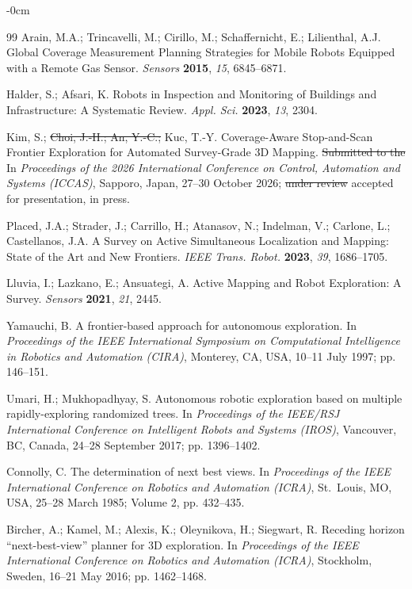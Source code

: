 \documentclass[sensors,article,submit,pdftex,moreauthors]{Definitions/mdpi}
\providecommand{\DIFadd}[1]{{\protect\color{blue} \sf #1}} %
\providecommand{\DIFdel}[1]{{\protect\color{red}\protect\scriptsize\protect\sout{#1}}} %
\providecommand{\DIFaddbegin}{} %
\providecommand{\DIFaddend}{} %
\providecommand{\DIFdelbegin}{} %
\providecommand{\DIFdelend}{} %
\begin{document}
\begin{adjustwidth}{-\extralength}{0cm}
\begin{thebibliography}{99}
Arain, M.A.; Trincavelli, M.; Cirillo, M.; Schaffernicht, E.; Lilienthal, A.J. Global Coverage Measurement Planning Strategies for Mobile Robots Equipped with a Remote Gas Sensor. \textit{Sensors} \textbf{2015}, \textit{15}, 6845--6871.

Halder, S.; Afsari, K. Robots in Inspection and Monitoring of Buildings and Infrastructure: A Systematic Review. \textit{Appl. Sci.} \textbf{2023}, \textit{13}, 2304.

Kim, S.; \DIFdelbegin \DIFdel{Choi, J.-H.; An, Y.-C.; }\DIFdelend Kuc, T.-Y. Coverage-Aware Stop-and-Scan Frontier Exploration for Automated Survey-Grade 3D Mapping. \DIFdelbegin \DIFdel{Submitted to the }\DIFdelend \DIFaddbegin \DIFadd{In }\DIFaddend \textit{\DIFaddbegin \DIFadd{Proceedings of the }\DIFaddend 2026 International Conference on Control, Automation and Systems (ICCAS)}, Sapporo, Japan, 27--30 October 2026; \DIFdelbegin \DIFdel{under review}\DIFdelend \DIFaddbegin \DIFadd{accepted for presentation, in press}\DIFaddend .

Placed, J.A.; Strader, J.; Carrillo, H.; Atanasov, N.; Indelman, V.; Carlone, L.; Castellanos, J.A. A Survey on Active Simultaneous Localization and Mapping: State of the Art and New Frontiers. \textit{IEEE Trans. Robot.} \textbf{2023}, \textit{39}, 1686--1705.

Lluvia, I.; Lazkano, E.; Ansuategi, A. Active Mapping and Robot Exploration: A Survey. \textit{Sensors} \textbf{2021}, \textit{21}, 2445.

Yamauchi, B. A frontier-based approach for autonomous exploration. In \textit{Proceedings of the IEEE International Symposium on Computational Intelligence in Robotics and Automation (CIRA)}, Monterey, CA, USA, 10--11 July 1997; pp. 146--151.

Umari, H.; Mukhopadhyay, S. Autonomous robotic exploration based on multiple rapidly-exploring randomized trees. In \textit{Proceedings of the IEEE/RSJ International Conference on Intelligent Robots and Systems (IROS)}, Vancouver, BC, Canada, 24--28 September 2017; pp. 1396--1402.

Connolly, C. The determination of next best views. In \textit{Proceedings of the IEEE International Conference on Robotics and Automation (ICRA)}, St.\ Louis, MO, USA, 25--28 March 1985; Volume 2, pp. 432--435.

Bircher, A.; Kamel, M.; Alexis, K.; Oleynikova, H.; Siegwart, R. Receding horizon ``next-best-view'' planner for 3D exploration. In \textit{Proceedings of the IEEE International Conference on Robotics and Automation (ICRA)}, Stockholm, Sweden, 16--21 May 2016; pp. 1462--1468.


\end{thebibliography}
\end{adjustwidth}
\end{document}
